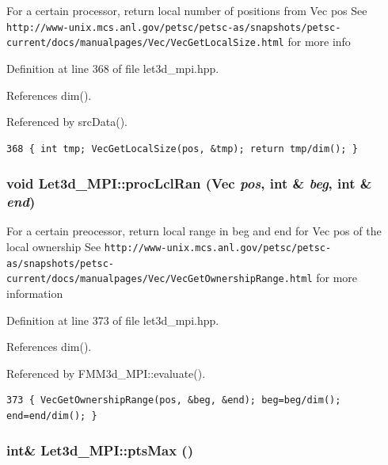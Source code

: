 For a certain processor, return local number of positions from Vec pos See {\tt http://www-unix.mcs.anl.gov/petsc/petsc-as/snapshots/petsc-current/docs/manualpages/Vec/Vec\-Get\-Local\-Size.html} for more info 

Definition at line 368 of file let3d\_\-mpi.hpp.

References dim().

Referenced by src\-Data().

\footnotesize\begin{verbatim}368 { int tmp; VecGetLocalSize(pos, &tmp); return tmp/dim(); }
\end{verbatim}\normalsize 


\subsubsection{\setlength{\rightskip}{0pt plus 5cm}void Let3d\_\-MPI::proc\-Lcl\-Ran (Vec {\em pos}, int \& {\em beg}, int \& {\em end})\hspace{0.3cm}{\tt  [inline]}}\label{classLet3d__MPI_c77ddf71aecd48cd8a8ed887d5bcd834_c77ddf71aecd48cd8a8ed887d5bcd834}


For a certain preocessor, return local range in beg and end for Vec pos of the local ownership See {\tt http://www-unix.mcs.anl.gov/petsc/petsc-as/snapshots/petsc-current/docs/manualpages/Vec/Vec\-Get\-Ownership\-Range.html} for more information 

Definition at line 373 of file let3d\_\-mpi.hpp.

References dim().

Referenced by FMM3d\_\-MPI::evaluate().

\footnotesize\begin{verbatim}373 { VecGetOwnershipRange(pos, &beg, &end); beg=beg/dim(); end=end/dim(); }
\end{verbatim}\normalsize 


\subsubsection{\setlength{\rightskip}{0pt plus 5cm}int\& Let3d\_\-MPI::pts\-Max ()\hspace{0.3cm}{\tt  [inline]}}\label{classLet3d__MPI_682c29880d87862bd529f951970bf83a_682c29880d87862bd529f951970bf83a}


